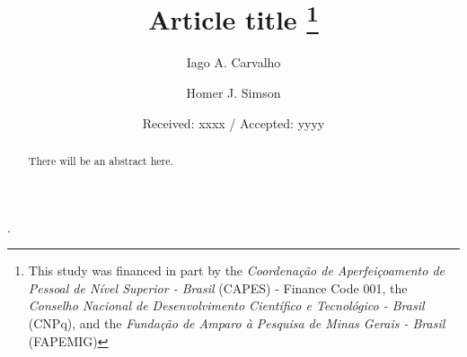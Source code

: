 \documentclass{svjour3}                      %
\begin{document}
\title{Article title \thanks{This study was financed in part by the \emph{Coordenação de Aperfeiçoamento de Pessoal de Nível Superior - Brasil} (CAPES) - Finance Code 001, the \emph{Conselho Nacional de Desenvolvimento Científico e Tecnológico - Brasil} (CNPq), and the \emph{Fundação de Amparo à Pesquisa de Minas Gerais - Brasil} (FAPEMIG)}}.


\author{Iago A. Carvalho \and Homer J. Simson}



\date{Received: xxxx / Accepted: yyyy}

\maketitle

\begin{abstract}
There will be an abstract here.
\end{abstract}



\end{document}
